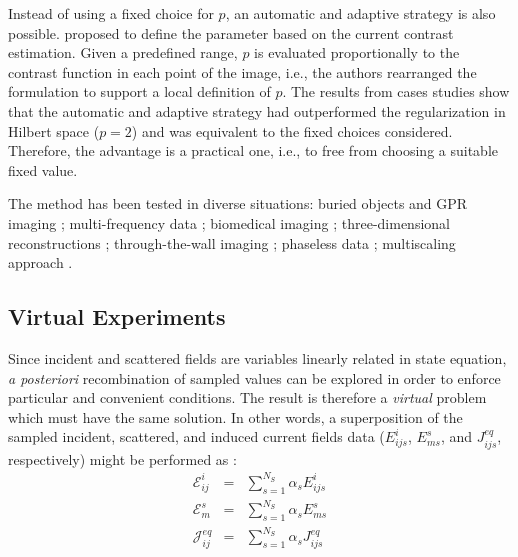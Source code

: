 			Instead of using a fixed choice for $p$, an automatic and adaptive strategy is also possible. \cite{estatico2018quantitative} proposed to define the parameter based on the current contrast estimation. Given a predefined range, $p$ is evaluated proportionally to the contrast function in each point of the image, i.e., the authors rearranged the formulation to support a local definition of $p$. The results from cases studies show that the automatic and adaptive strategy had outperformed the regularization in Hilbert space ($p=2$) and was equivalent to the fixed choices considered. Therefore, the advantage is a practical one, i.e., to free from choosing a suitable fixed value.
			
			The method has been tested in diverse situations: buried objects and GPR imaging \citep{estatico2013buried,fedeli2015multifrequency,fedeli2021nonlinear}; multi-frequency data \citep{estatico2015banach,estatico2015multifrequency}; biomedical imaging \citep{fedeli2017electromagnetic,estatico2017feasibility,bisio2017microwave,bisio2018brain,bisio2020variable,randazzo2021electrical,dachena2021microwave}; three-dimensional reconstructions \citep{estatico2016three,estatico2018three,estatico2018newton}; through-the-wall imaging \citep{fedeli2017preliminary}; phaseless data \citep{estatico2020phaseless}; multiscaling approach \citep{randazzo2021assessment}.
			
		\subsection{Virtual Experiments}\label{chap:methods:deterministic:virtualexperiments}
		
			Since incident and scattered fields are variables linearly related in state equation, \textit{a posteriori} recombination of sampled values can be explored in order to enforce particular and convenient conditions. The result is therefore a \textit{virtual} problem which must have the same solution. In other words, a superposition of the sampled incident, scattered, and induced current fields data ($E^i_{ijs}$, $E^s_{ms}$, and $J^{eq}_{ijs}$, respectively) might be performed as \citep{donato2015inverse}:
			\begin{eqnarray}
				\mathscr{E}^i_{ij} &=& \sum\limits_{s=1}^{N_S} \alpha_s E^i_{ijs} \\
				\mathscr{E}^s_m &=& \sum\limits_{s=1}^{N_S} \alpha_s E^s_{ms} \\
				\mathscr{J}^{eq}_{ij} &=& \sum\limits_{s=1}^{N_S} \alpha_s J^{eq}_{ijs}
			\end{eqnarray}

